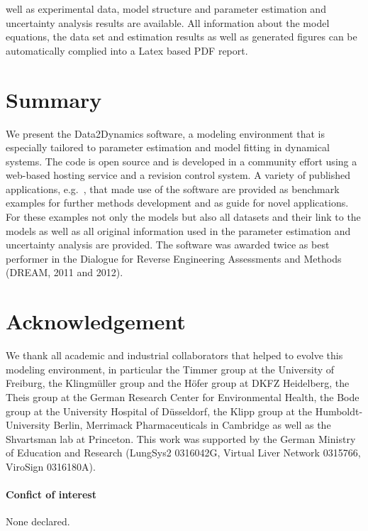 \documentclass{bioinfo}
\begin{document}
well as experimental data, model structure and parameter estimation and uncertainty analysis 
results are available. All information about the model equations, the data set and estimation 
results as well as generated figures can be automatically complied into a Latex based PDF 
report.

\section{Summary}
We present the Data2Dynamics software, a modeling environment that is especially tailored to 
parameter estimation and model fitting in dynamical systems. The code is open source and is 
developed in a community effort using a web-based hosting service and a revision control 
system. A variety of published applications, e.g.~\citet{Becker:2010hs, Raia:2011vn, 
Bachmann:2011fk}, that made use of the software are provided as benchmark examples for 
further methods development and as guide for novel applications. For these examples not 
only the models but also all datasets and their link to the models as well as all original 
information used in the parameter estimation and uncertainty analysis are provided. The 
software was awarded twice as best performer in the Dialogue for Reverse Engineering 
Assessments and Methods (DREAM, 2011 and 2012).

\section*{Acknowledgement}
We thank all academic and industrial collaborators that helped to evolve this modeling 
environment, in particular the Timmer group at the University of Freiburg, the Klingm\"uller 
group and the H\"ofer group at DKFZ Heidelberg, the Theis group at the German Research 
Center for Environmental Health, the Bode group at the University Hospital of D\"usseldorf, 
the Klipp group at the Humboldt-University Berlin, Merrimack Pharmaceuticals in Cambridge 
as well as the Shvartsman lab at Princeton. 
%
This work was supported by the German Ministry of Education and Research (LungSys2 
0316042G, Virtual Liver Network 0315766, ViroSign 0316180A).

\paragraph{Confict of interest\textcolon} None declared.



\end{document}
